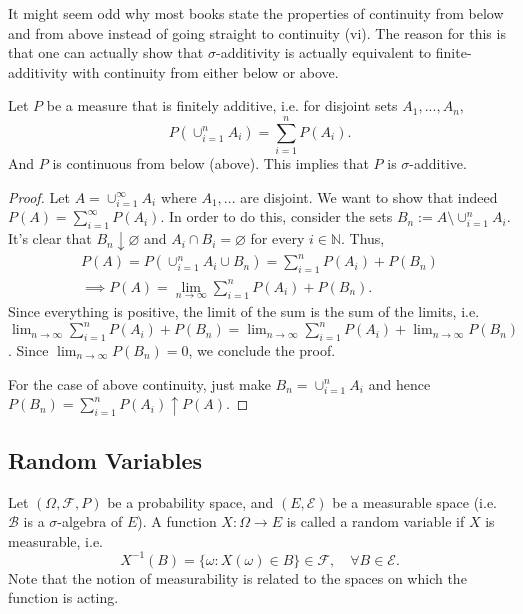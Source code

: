 It might seem odd why most books state the properties of continuity from below and
from above instead of going straight to continuity (vi). The reason for this is that
one can actually show that $\sigma$-additivity is actually equivalent to
finite-additivity with continuity from either below or above.

\begin{proposition}
  Let $P$ be a measure that is finitely additive, i.e.
  for disjoint sets $A_1,...,A_n$,
  \begin{displaymath}
    P(\cup_{i=1}^n A_i) = \sum^n_{i=1} P(A_i).
  \end{displaymath}
  And $P$ is continuous from below (above).
  This implies that $P$ is $\sigma$-additive.
\end{proposition}
\begin{proof}
  Let $A = \cup_{i=1}^\infty A_i$ where $A_1,...$ are disjoint. We want to show that indeed
  $P(A) = \sum^\infty_{i=1}P(A_i)$. In order to do this, consider the sets
  $B_n:= A \setminus \cup^n_{i=1}A_i$. It's clear that $B_n \downarrow \varnothing$
  and $A_i \cap B_i = \varnothing$ for every $i \in \mathbb N$. Thus,
  \begin{align*}
    P(A) = P(\cup^n_{i=1} A_i \cup B_n) = \sum^n_{i=1} P(A_i) + P(B_n) \\ \implies
    P(A) =
    \lim_{n\to \infty} \sum^n_{i=1} P(A_i) + P(B_n).
  \end{align*}
  Since everything is positive, the limit of the sum is the sum of the limits, i.e.
  $\lim_{n\to \infty} \sum^n_{i=1} P(A_i) + P(B_n) =
  \lim_{n\to \infty} \sum^n_{i=1} P(A_i) + \lim_{n \to \infty} P(B_n)$. Since
  $\lim_{n\to \infty} P(B_n) = 0$, we conclude the proof.

  For the case of above continuity, just make $B_n = \cup^n_{i=1} A_i$ and
  hence $P(B_n) = \sum^n_{i=1}P(A_i) \uparrow P(A)$.

\end{proof}

\subsection{Random Variables}

\begin{definition}

	Let $(\Omega, \mathcal F, P)$ be a probability space, and $(E,\mathcal E)$ be a measurable space
	(i.e. $\mathcal B$ is a $\sigma$-algebra of $E$). A function $X:\Omega\to E$ is called
	a random variable if $X$ is measurable, i.e.
	\begin{equation}
		X^{-1}(B) = \{\omega: X(\omega) \in B\} \in \mathcal F, \quad \forall B \in \mathcal E.
	\end{equation}
	Note that the notion of measurability is related to the spaces on which the function is acting.
\end{definition}

